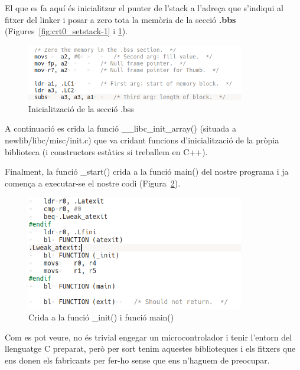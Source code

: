 El que es fa aquí és inicialitzar el punter de l’stack a l’adreça que s’indiqui al 
fitxer del linker i posar a zero tota la memòria de la secció {\bf .bbs} 
(Figures~\ref{fig:crt0_setstack-1} i \ref{fig:crt0_bssinit}).

\begin{figure}
 \centering
 \includegraphics[width=0.85\textwidth, keepaspectratio]{imatges/crt0_bssinit.png}
 \caption{Inicialització de la secció .bss}
 \label{fig:crt0_bssinit}
\end{figure}


A continuació es crida la funció \_\_libc\_init\_array() 
(situada a newlib/libc/misc/init.c) que va cridant funcions d’inicialització 
de la pròpia biblioteca (i constructors estàtics si treballem en C++).

Finalment, la funció \_start() crida a la funció main() del nostre programa i ja 
comença a executar-se el nostre codi (Figura~\ref{fig:crt0_callmain}).

\begin{figure}
 \centering
 \includegraphics[width=0.85\textwidth, keepaspectratio]{imatges/crt0_callmain.png}
 \caption{Crida a la funció \_init() i funció main()}
 \label{fig:crt0_callmain}
\end{figure}

Com es pot veure, no és trivial engegar un microcontrolador i tenir l’entorn del 
llenguatge C preparat, però per sort tenim aquestes biblioteques i els fitxers
que ens donen els fabricants per fer-ho sense que ens n’haguem de preocupar.


